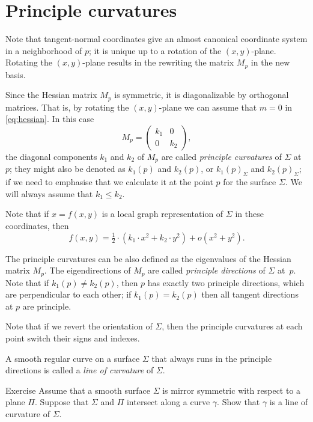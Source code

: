 \section{Principle curvatures}

Note that tangent-normal coordinates give an almost canonical coordinate system in a neighborhood of $p$;
it is unique up to a rotation of  the $(x,y)$-plane.
Rotating the $(x,y)$-plane results in the rewriting   
the matrix $M_p$ in the new basis.

Since the Hessian matrix $M_p$ is symmetric, it is diagonalizable by orthogonal matrices.
That is, by rotating the $(x,y)$-plane we can assume that $m=0$ in \ref{eq:hessian}. %
In this case
\[M_p=\begin{pmatrix}
   k_1
   &0
   \\
   0
   &k_2
  \end{pmatrix},
\]
the diagonal components $k_1$ and $k_2$ of $M_p$ are called \emph{principle curvatures} of $\Sigma$ at $p$;
they might also be denoted as $k_1(p)$ and $k_2(p)$, or $k_1(p)_\Sigma$ and $k_2(p)_\Sigma$;
if we need to emphasise that we calculate it at the point $p$ for the surface $\Sigma$.
We will always assume that $k_1\le k_2$.


Note that if $x=f(x,y)$ is a local graph representation of $\Sigma$ in these coordinates, then 
\[f(x,y)=\tfrac12\cdot(k_1\cdot x^2+k_2\cdot y^2)+o(x^2+y^2).\]

The principle curvatures can be also defined as the eigenvalues of the Hessian matrix $M_p$.
The eigendirections of $M_p$  are called \emph{principle directions} of $\Sigma$ at~$p$.
Note that if $k_1(p)\ne k_2(p)$, then $p$ has exactly two principle directions, which are perpendicular to each other; if $k_1(p)= k_2(p)$ then all tangent directions at $p$ are principle.

Note that if we revert the orientation of $\Sigma$, then the principle curvatures at each point switch their signs and indexes.

A smooth regular curve on a surface $\Sigma$ that always runs in the principle directions is called a \emph{line of curvature} of $\Sigma$.  

\begin{thm}{Exercise}\label{ex:line-of-curvature}
Assume that a smooth surface $\Sigma$ is mirror symmetric with respect to  a plane $\Pi$.
Suppose that $\Sigma$ and $\Pi$ intersect along a curve $\gamma$.
Show that $\gamma$ is a line of curvature of $\Sigma$.
\end{thm}


